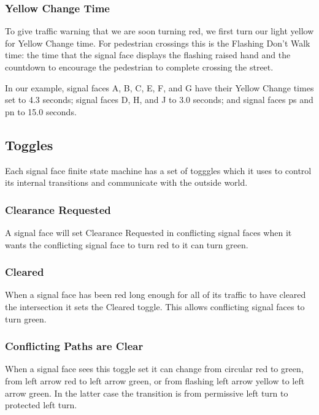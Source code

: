 \documentclass[letterpaper,twoside]{article}
\begin{document}
\subsubsection{Yellow Change Time}
To give traffic warning that we are soon turning red, we first turn our light
yellow for Yellow Change time.  For pedestrian crossings this is the
Flashing Don't Walk time: the time that the signal face displays the flashing
raised hand and the countdown to encourage the pedestrian to complete
crossing the street.

In our example, signal faces A, B, C, E, F, and G have their Yellow Change
times set to 4.3 seconds; signal faces D, H, and J to 3.0 seconds;
and signal faces ps and pn to 15.0 seconds.

\subsection{Toggles}

Each signal face finite state machine has a set of togggles which it uses
to control its internal transitions and communicate with the
outside world.

\subsubsection{Clearance Requested}

A signal face will set Clearance Requested in conflicting signal faces
when it wants the conflicting signal face to turn red to it can turn green.

\subsubsection{Cleared}

When a signal face has been red long enough for all of its traffic
to have cleared the intersection it sets the Cleared toggle.
This allows conflicting signal faces to turn green.

\subsubsection{Conflicting Paths are Clear}

When a signal face sees this toggle set it can change from circular red
to green, from left arrow red to left arrow green, or from flashing
left arrow yellow to left arrow green.
In the latter case the transition is from permissive left turn to
protected left turn.
\end{document}
